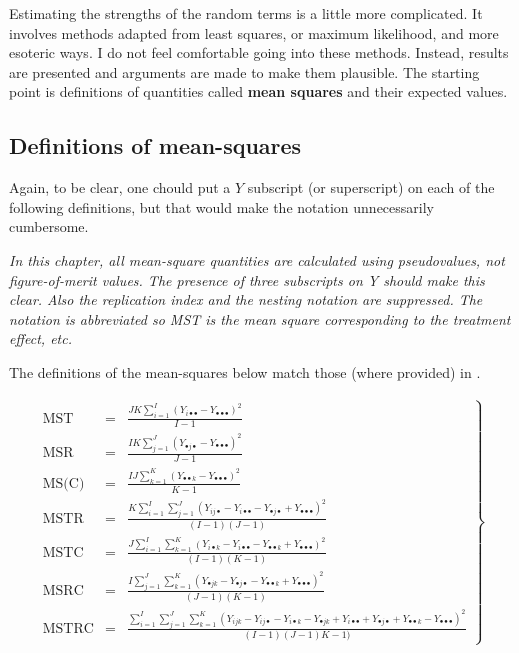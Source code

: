 \documentclass[
]{book}
\begin{document}
Estimating the strengths of the random terms is a little more complicated. It involves methods adapted from least squares, or maximum likelihood, and more esoteric ways. I do not feel comfortable going into these methods. Instead, results are presented and arguments are made to make them plausible. The starting point is definitions of quantities called \textbf{mean squares} and their expected values.

\hypertarget{definitions-of-mean-squares}{%
\subsection{Definitions of mean-squares}\label{definitions-of-mean-squares}}

Again, to be clear, one chould put a \(Y\) subscript (or superscript) on each of the following definitions, but that would make the notation unnecessarily cumbersome.

\emph{In this chapter, all mean-square quantities are calculated using pseudovalues, not figure-of-merit values. The presence of three subscripts on Y should make this clear. Also the replication index and the nesting notation are suppressed. The notation is abbreviated so MST is the mean square corresponding to the treatment effect, etc.}

The definitions of the mean-squares below match those (where provided) in \citep[page 1261]{RN1476}.

\begin{align}
\left.\begin{array}{rll}
\text{MST}&=&\frac{JK\sum_{i=1}^{I}\left ( Y_{i \bullet \bullet} - Y_{ \bullet \bullet \bullet} \right )^2}{I-1}\\[0.5em]
\text{MSR}&=&\frac{IK\sum_{j=1}^{J}\left ( Y_{\bullet j \bullet} - Y_{ \bullet \bullet \bullet} \right )^2}{J-1}\\[0.5em] 
\text{MS(C)}&=&\frac{IJ\sum_{k=1}^{K}\left ( Y_{\bullet \bullet k} - Y_{ \bullet \bullet \bullet} \right )^2}{K-1}\\[0.5em] 
\text{MSTR}&=&\frac{K\sum_{i=1}^{I}\sum_{j=1}^{J}\left ( Y_{i j \bullet} - Y_{i \bullet \bullet} - Y_{\bullet j \bullet} + Y_{ \bullet \bullet \bullet} \right )^2}{(I-1)(J-1)}\\[0.5em] 
\text{MSTC}&=&\frac{J\sum_{i=1}^{I}\sum_{k=1}^{K}\left ( Y_{i \bullet k} - Y_{i \bullet \bullet} - Y_{\bullet \bullet k} + Y_{ \bullet \bullet \bullet} \right )^2}{(I-1)(K-1)}\\[0.5em] 
\text{MSRC}&=&\frac{I\sum_{j=1}^{J}\sum_{k=1}^{K}\left ( Y_{\bullet j k} - Y_{\bullet j \bullet} - Y_{\bullet \bullet k} + Y_{ \bullet \bullet \bullet} \right )^2}{(J-1)(K-1)}\\[0.5em] 
\text{MSTRC}&=&\frac{\sum_{i=1}^{I}\sum_{j=1}^{J}\sum_{k=1}^{K}\left ( Y_{i j k} - Y_{i j \bullet} - Y_{i \bullet k} - Y_{\bullet j k} + Y_{i \bullet \bullet} + Y_{\bullet j \bullet} + Y_{\bullet \bullet k} - Y_{ \bullet \bullet \bullet} \right )^2}{(I-1)(J-1)K-1)}
\end{array}\right\}
\label{eq:MeanSquares}
\end{align}
\end{document}
